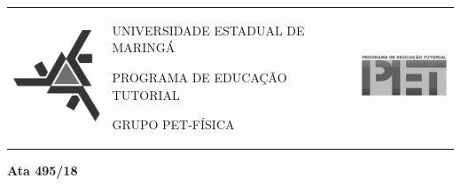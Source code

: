 \documentclass[a4paper,12pt]{report}
\begin{document}

\begin{center}
	\begin{tabular}{m{3.0cm}m{10.0cm}m{3.0cm}}
		\includegraphics[width=3.0cm]{uemp.png} &
		\begin{center}
			\large UNIVERSIDADE ESTADUAL DE MARINGÁ
	
			\large PROGRAMA DE EDUCAÇÃO TUTORIAL          
		
			\large GRUPO PET-FÍSICA						   
		\end{center} 							   &
		
		\includegraphics[width=3.0cm]{petp.png} \\
	\end{tabular}
\end{center}
\vspace{0.7cm}

\begin{center}
	{\large {\bf Ata 495/18}}
\end{center}

\vspace{0.4cm}
\end{document}
